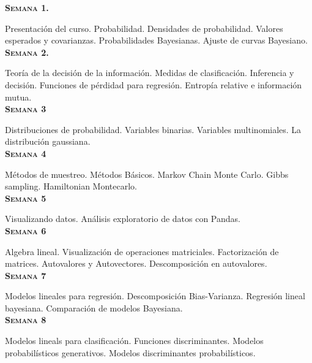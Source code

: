 \documentclass[letterpaper,10pt,onecolumn]{article}
\begin{document}

\noindent\textbf{\textsc{Semana 1.}} 

Presentaci\'on del curso. Probabilidad. Densidades de probabilidad. 
Valores esperados y covarianzas. Probabilidades Bayesianas.
Ajuste de curvas Bayesiano.
\\[-0.3cm] %

\noindent\textbf{\textsc{Semana 2.}} 

Teor\'ia de la decisi\'on de la informaci\'on. 
Medidas de clasificaci\'on. Inferencia y decisi\'on.
Funciones de p\'erdidad para regresi\'on.
Entrop\'ia relative e informaci\'on mutua.
\\[-0.3cm] %

\noindent\textbf{\textsc{Semana 3}}

Distribuciones de probabilidad. Variables binarias. Variables
multinomiales. La distribuci\'on gaussiana.
\\[-0.3cm] %

\noindent\textbf{\textsc{Semana 4}}

M\'etodos de muestreo. M\'etodos B\'asicos. Markov Chain Monte
Carlo. Gibbs sampling. Hamiltonian Montecarlo.
\\[-0.3cm] %


\noindent\textbf{\textsc{Semana 5}}

Visualizando datos. An\'alisis exploratorio de datos con Pandas. 
\\[-0.3cm] %

\noindent\textbf{\textsc{Semana 6}}

Algebra lineal. Visualizaci\'on de operaciones
matriciales. Factorizaci\'on de matrices. Autovalores y Autovectores.
Descomposici\'on en autovalores.
\\[-0.3cm] %

\noindent\textbf{\textsc{Semana 7}}

Modelos lineales para regresi\'on. 
Descomposici\'on
Bias-Varianza. Regresi\'on lineal bayesiana.
Comparaci\'on de modelos Bayesiana.
\\[-0.3cm] %

\noindent\textbf{\textsc{Semana 8}}

Modelos lineals para clasificaci\'on.
Funciones discriminantes. Modelos probabil\'isticos generativos.
Modelos discriminantes probabil\'isticos.
\\[-0.3cm] %
\end{document}
